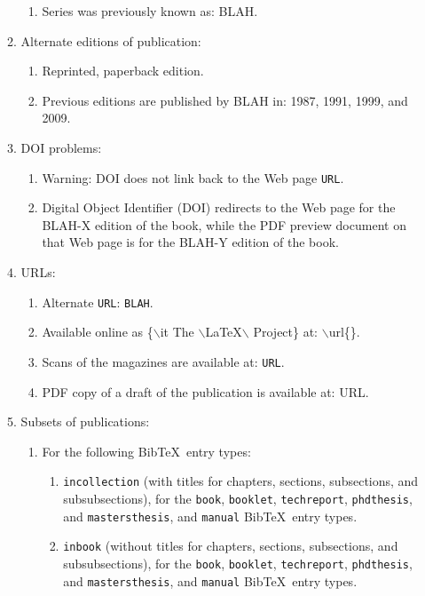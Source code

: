 \documentclass[letter,12pt]{article}
\begin{document}
\begin{enumerate}
\begin{enumerate}
\begin{enumerate}
		\item Series was previously known as: BLAH.
		\end{enumerate}
	\item Alternate editions of publication: \vspace{-0.2cm}
		\begin{enumerate} \itemsep -2pt
		\item Reprinted, paperback edition.
		\item Previous editions are published by BLAH in: 1987, 1991, 1999, and 2009.
		\end{enumerate}
	\item DOI problems: \vspace{-0.2cm}
		\begin{enumerate} \itemsep -2pt
		\item Warning: DOI does not link back to the Web page {\tt URL}.
		\item Digital Object Identifier (DOI) redirects to the Web page for the BLAH-X edition of the book, while the PDF preview document on that Web page is for the BLAH-Y edition of the book.
		\end{enumerate}
	\item URLs: \vspace{-0.2cm}
		\begin{enumerate} \itemsep -2pt
		\item Alternate {\tt URL}: {\tt BLAH}.
		\item Available online as \{$\backslash$it The $\backslash$LaTeX$\backslash$ Project\} at: $\backslash$url\{\}.
		\item Scans of the magazines are available at: {\tt URL}.
		\item PDF copy of a draft of the publication is available at: URL.
		\end{enumerate}
	\item Subsets of publications: \vspace{-0.2cm}
		\begin{enumerate} \itemsep -2pt
		\item For the following {\sc Bib}\TeX\ entry types: \vspace{-0.1cm}
			\begin{enumerate} \itemsep -1pt
			\item {\tt incollection} (with titles for chapters, sections, subsections, and subsubsections), for the {\tt book}, {\tt booklet}, {\tt techreport}, {\tt phdthesis}, and {\tt mastersthesis}, and {\tt manual} {\sc Bib}\TeX\ entry types.
			\item {\tt inbook} (without titles for chapters, sections, subsections, and subsubsections), for the {\tt book}, {\tt booklet}, {\tt techreport}, {\tt phdthesis}, and {\tt mastersthesis}, and {\tt manual} {\sc Bib}\TeX\ entry types.

\end{enumerate}
\end{enumerate}
\end{enumerate}
\end{enumerate}
\end{document}
